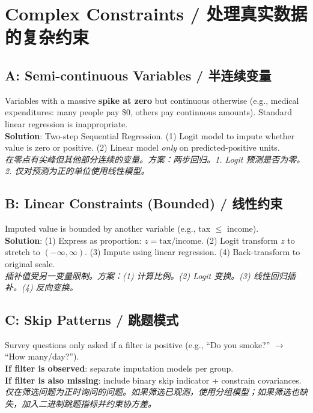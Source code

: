 \documentclass[9pt, a4paper]{article}
\begin{document}
\section{Complex Constraints / 处理真实数据的复杂约束}

\subsection{A: Semi-continuous Variables / 半连续变量}
\begin{tcolorbox}[defbox]
    Variables with a massive \textbf{spike at zero} but continuous otherwise (e.g., medical expenditures: many people pay \$0, others pay continuous amounts). Standard linear regression is inappropriate.\\
    \textbf{Solution}: Two-step Sequential Regression. (1) Logit model to impute whether value is zero or positive. (2) Linear model \textit{only} on predicted-positive units.\\
    \textit{在零点有尖峰但其他部分连续的变量。方案：两步回归。1. Logit 预测是否为零。2. 仅对预测为正的单位使用线性模型。}
\end{tcolorbox}

\subsection{B: Linear Constraints (Bounded) / 线性约束}
\begin{tcolorbox}[defbox]
    Imputed value is bounded by another variable (e.g., tax $\le$ income).\\
    \textbf{Solution}: (1) Express as proportion: $z = \text{tax}/\text{income}$. (2) Logit transform $z$ to stretch to $(-\infty, \infty)$. (3) Impute using linear regression. (4) Back-transform to original scale.\\
    \textit{插补值受另一变量限制。方案：(1) 计算比例。(2) Logit 变换。(3) 线性回归插补。(4) 反向变换。}
\end{tcolorbox}

\subsection{C: Skip Patterns / 跳题模式}
\begin{tcolorbox}[defbox]
    Survey questions only asked if a filter is positive (e.g., ``Do you smoke?'' $\to$ ``How many/day?'').\\
    \textbf{If filter is observed}: separate imputation models per group.\\
    \textbf{If filter is also missing}: include binary skip indicator + constrain covariances.\\
    \textit{仅在筛选问题为正时询问的问题。如果筛选已观测，使用分组模型；如果筛选也缺失，加入二进制跳题指标并约束协方差。}
\end{tcolorbox}
\end{document}
